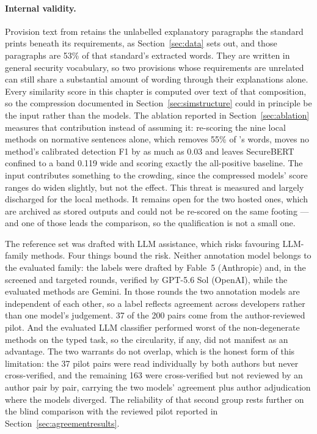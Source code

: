 \paragraph{Internal validity.} Provision text from \standardA{} retains the
unlabelled explanatory paragraphs the standard prints beneath its requirements,
as Section~\ref{sec:data} sets out, and those paragraphs are 53\% of that
standard's extracted words. They are written in general security vocabulary,
so two provisions whose requirements are unrelated can still share a
substantial amount of wording through their explanations alone. Every
similarity score in this chapter is computed over text of that composition, so
the compression documented in Section~\ref{sec:simstructure} could in principle
be the input rather than the models. The ablation reported in
Section~\ref{sec:ablation} measures that contribution instead of assuming it:
re-scoring the nine local methods on normative sentences alone, which removes
55\% of \standardA{}'s words, moves no method's calibrated detection F1 by as much
as 0.03 and leaves SecureBERT confined to a band 0.119 wide and scoring exactly
the all-positive baseline. The input contributes something to the crowding, since
the compressed models' score ranges do widen slightly, but not the effect. This
threat is measured and largely discharged for the local methods. It
remains open for the two hosted ones, which are archived as stored outputs and
could not be re-scored on the same footing --- and one of those leads the
comparison, so the qualification is not a small one.

The reference set was drafted with LLM
assistance, which risks favouring LLM-family methods. Four things bound the
risk. Neither annotation model belongs to the evaluated family: the labels were
drafted by Fable~5 (Anthropic) and, in the screened and targeted rounds, verified by
GPT-5.6 Sol (OpenAI), while the evaluated
methods are Gemini. In those rounds the two annotation models are independent of
each other, so a label reflects agreement across developers rather than one
model's judgement.
37 of the 200 pairs come from the author-reviewed pilot. And the evaluated LLM
classifier performed worst of the non-degenerate methods on the typed task, so
the circularity, if any, did not manifest as an advantage. The two warrants do
not overlap, which is the honest form of this limitation: the 37 pilot pairs
were read individually by both authors but never cross-verified, and the
remaining 163 were cross-verified but not reviewed by an author pair by pair,
carrying the two models' agreement plus author adjudication where the models
diverged. The reliability of that second group rests further on the blind
comparison with the reviewed pilot reported in
Section~\ref{sec:agreementresults}.

